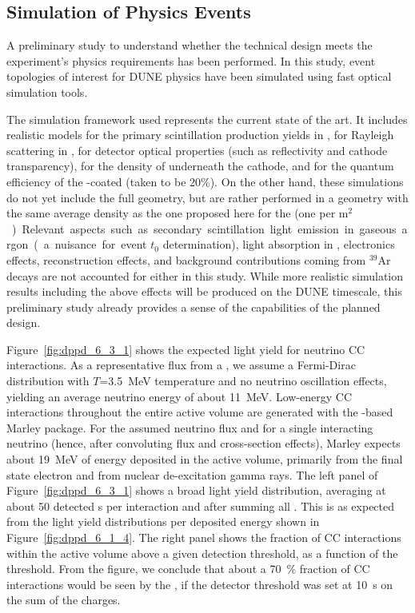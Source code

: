 \subsection{Simulation of Physics Events}
\label{sec:fddp-pd-6.3}

A preliminary study to understand whether the \dual {} technical design meets the experiment's physics requirements has been performed. In this study, event topologies of interest for DUNE physics have been simulated using \larsoft fast optical simulation tools.

The simulation framework used represents the current state of the art. It includes realistic models for the primary scintillation production yields in \lar, for Rayleigh scattering in \lar, for detector optical properties (such as  reflectivity and cathode transparency), for the density of  underneath the cathode, and for the quantum efficiency of the -coated  (taken to be \num{20}\%). On the other hand, these simulations do not yet include the full  geometry, but are rather performed in a  geometry with the same average  density as the one proposed here for the  (one  per \si{m$^2$}). Relevant aspects such as secondary scintillation light emission in gaseous argon (a nuisance for event $t_0$ determination), light absorption in \lar, electronics effects, reconstruction effects, and background contributions coming from $^{39}$Ar decays are not accounted for either in this study. While more realistic simulation results including the above effects will be produced on the DUNE  timescale, this preliminary study already provides a sense of the capabilities of the planned  design.

Figure~\ref{fig:dppd_6_3_1} shows the expected light yield for  neutrino CC interactions. As a representative \nue flux from a , we assume a Fermi-Dirac distribution with $T$=\SI{3.5}{\MeV} temperature and no neutrino oscillation effects, yielding an average neutrino energy of about \SI{11}{MeV}. Low-energy \nue CC interactions throughout the entire \lartpc active volume are generated with the \larsoft-based Marley package. For the assumed  neutrino flux and for a single interacting neutrino (hence, after convoluting flux and cross-section effects), Marley expects about \SI{19}{\MeV} of energy deposited in the \lar active volume, primarily from the final state electron and from nuclear de-excitation gamma rays. The left panel of Figure~\ref{fig:dppd_6_3_1} shows a broad light yield distribution, averaging at about \num{50} detected \phel{}s per interaction and after summing all . This is as expected from the light yield distributions per deposited energy shown in Figure~\ref{fig:dppd_6_1_4}. The right panel shows the fraction of  \nue CC interactions within the \lartpc active volume above a given \phel detection threshold, as a function of the \phel threshold. From the figure, we conclude that about a \SI{70}{\%} fraction of  \nue CC interactions would be seen by the , if the detector threshold was set at \num{10}~\phel{}s on the sum of the  charges.

